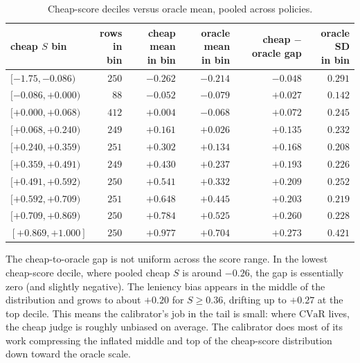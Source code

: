 \documentclass[11pt]{article}
\newcommand{\CVaR}{\mathrm{CVaR}}
\begin{document}
\begin{table}[h]
\centering\small
\caption{Cheap-score deciles versus oracle mean, pooled across
policies.}
\label{tab:reliability}
\begin{tabular}{l r r r r r}
\toprule
\thead{cheap $S$\\ bin} & \thead{rows\\ in bin} & \thead{cheap mean\\ in bin} & \thead{oracle mean\\ in bin} & \thead{cheap $-$\\ oracle gap} & \thead{oracle SD\\ in bin} \\
\midrule
$[-1.75, -0.086)$  & $250$ & $-0.262$ & $-0.214$ & $-0.048$ & $0.291$ \\
$[-0.086, +0.000)$ & $ 88$ & $-0.052$ & $-0.079$ & $+0.027$ & $0.142$ \\
$[+0.000, +0.068)$ & $412$ & $+0.004$ & $-0.068$ & $+0.072$ & $0.245$ \\
$[+0.068, +0.240)$ & $249$ & $+0.161$ & $+0.026$ & $+0.135$ & $0.232$ \\
$[+0.240, +0.359)$ & $251$ & $+0.302$ & $+0.134$ & $+0.168$ & $0.208$ \\
$[+0.359, +0.491)$ & $249$ & $+0.430$ & $+0.237$ & $+0.193$ & $0.226$ \\
$[+0.491, +0.592)$ & $250$ & $+0.541$ & $+0.332$ & $+0.209$ & $0.252$ \\
$[+0.592, +0.709)$ & $251$ & $+0.648$ & $+0.445$ & $+0.203$ & $0.219$ \\
$[+0.709, +0.869)$ & $250$ & $+0.784$ & $+0.525$ & $+0.260$ & $0.228$ \\
$[+0.869, +1.000]$ & $250$ & $+0.977$ & $+0.704$ & $+0.273$ & $0.421$ \\
\bottomrule
\end{tabular}
\end{table}

The cheap-to-oracle gap is not uniform across the score range. In the
lowest cheap-score decile, where pooled cheap $S$ is around $-0.26$,
the gap is essentially zero (and slightly negative). The leniency bias
appears in the middle of the distribution and grows to about $+0.20$
for $S \ge 0.36$, drifting up to $+0.27$ at the top decile. This means
the calibrator's job in the tail is small: where $\CVaR$ lives, the
cheap judge is roughly unbiased on average. The calibrator does most
of its work compressing the inflated middle and top of the
cheap-score distribution down toward the oracle scale.
\end{document}
